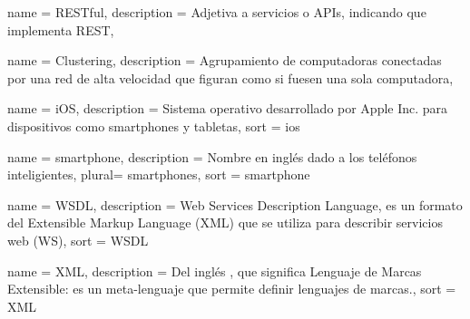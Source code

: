 \newpage

 {
  name = {RESTful},
  description = {Adjetiva a servicios o APIs, indicando que implementa REST},
}

 {
  name = {Clustering},
  description = {Agrupamiento de computadoras conectadas por una red de alta velocidad que figuran como si fuesen una sola computadora},
}

 {
  name = {iOS},
  description = {Sistema operativo desarrollado por Apple Inc. para dispositivos
  como smartphones y tabletas}, sort = {ios}
}

 {
  name = {smartphone},
  description = {Nombre en inglés dado a los teléfonos inteligientes},
  plural= {smartphones},
  sort = {smartphone}
}

 {
  name = {WSDL},
  description = {Web Services Description Language, es un formato del Extensible Markup Language (XML) que se utiliza para describir servicios web (WS)},
  sort = {WSDL}
}

 {
  name = {XML},
  description = {Del inglés , que significa Lenguaje de Marcas Extensible: es un meta-lenguaje que permite definir lenguajes de marcas.},
  sort = {XML}
}




